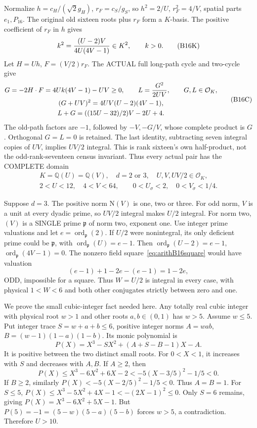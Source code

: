 Normalize \(h=c_H/(\sqrt2g_H)\),
\(r_F=c_S/g_S\), so
\(h^2=2/U\), \(r_F^2=4/V\), spatial parts
\(e_1,P_{16}\).
The original old sixteen roots plus \(r_F\)
form a \(K\)-basis.
The positive coefficient of \(r_F\) in \(h\) gives
\[
                   k^2={(U-2)V\over4U(4V-1)}\in K^2,
                   \qquad k>0 .
\tag{B16K}\label{eq:arithB16square}
\]
Let \(H=Uh\), \(F=(V/2)r_F\).
The ACTUAL full long-path cycle and two-cycle give
\[
 \begin{gathered}
 G=-2H\cdot F=4Uk(4V-1)-UV\ge0,\qquad
 L={G^2\over2UV},\qquad G,L\in\mathcal O_K,\\
 (G+UV)^2=4UV(U-2)(4V-1),\\
 L+G=((15U-32)/2)V-2U+4 .
 \end{gathered}
\tag{B16C}\label{eq:arithB16cycles}
\]
The old-path factors are \(-1\), followed by
\(-V,-G/V\), whose complete product is \(G\).
Orthogonal \(G=L=0\) is retained.
The last identity, subtracting seven integral
copies of \(UV\), implies \(UV/2\) integral.
This is rank sixteen's own half-product, not
the odd-rank-seventeen census invariant.
Thus every actual pair has the COMPLETE domain
\[
 \begin{gathered}
 K=\mathbb Q(U)=\mathbb Q(V),\quad d=2\text{ or }3,\quad
 U,V,UV/2\in\mathcal O_K,\\
 2<U<12,\quad4<V<64,\qquad
 0<U_\sigma<2,\quad0<V_\sigma<1/4 .
 \end{gathered}
\]

Suppose \(d=3\).
The positive norm \(\mathrm N(V)\) is one, two or three.
For odd norm, \(V\) is a unit at every dyadic prime,
so \(UV/2\) integral makes \(U/2\) integral.
For norm two, \((V)\) is a SINGLE prime
\(\mathfrak p\) of norm two, exponent one.
Use integer prime valuations and let
\(e=\operatorname{ord}_{\mathfrak p}(2)\).
If \(U/2\) were nonintegral, its only deficient
prime could be \(\mathfrak p\), with
\(\operatorname{ord}_{\mathfrak p}(U)=e-1\).
Then
\(\operatorname{ord}_{\mathfrak p}(U-2)=e-1\),
\(\operatorname{ord}_{\mathfrak p}(4V-1)=0\).
The nonzero field square~\eqref{eq:arithB16square}
would have valuation
\[
                         (e-1)+1-2e-(e-1)=1-2e ,
\]
ODD, impossible for a square.
Thus \(W=U/2\) is integral in every case, with
physical \(1<W<6\) and both other conjugates
strictly between zero and one.

We prove the small cubic-integer fact needed here.
Any totally real cubic integer with physical root
\(w>1\) and other roots \(a,b\in(0,1)\) has \(w>5\).
Assume \(w\le5\).
Put integer trace \(S=w+a+b\le6\),
positive integer norms \(A=wab\), \(B=(w-1)(1-a)(1-b)\).
Its monic polynomial is
\[
              P(X)=X^3-SX^2+(A+S-B-1)X-A .
\]
It is positive between the two distinct small roots.
For \(0<X<1\), it increases with \(S\) and
decreases with \(A,B\).
If \(A\ge2\), then
\[
 P(X)\le X^3-6X^2+6X-2
                 <-5(X-3/5)^2-1/5<0 .
\]
If \(B\ge2\), similarly
\(P(X)<-5(X-2/5)^2-1/5<0\).
Thus \(A=B=1\).
For \(S\le5\),
\(P(X)\le X^3-5X^2+4X-1<-(2X-1)^2\le0\).
Only \(S=6\) remains, giving
\(P(X)=X^3-6X^2+5X-1\).
But \(P(5)=-1=(5-w)(5-a)(5-b)\) forces \(w>5\),
a contradiction.
Therefore \(U>10\).

